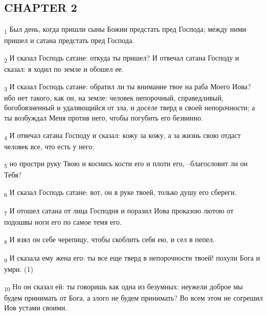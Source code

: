 \subsection{CHAPTER 2}
\begin{tcolorbox}
\textsubscript{1} Был день, когда пришли сыны Божии предстать пред Господа; между ними пришел и сатана предстать пред Господа.
\end{tcolorbox}
\begin{tcolorbox}
\textsubscript{2} И сказал Господь сатане: откуда ты пришел? И отвечал сатана Господу и сказал: я ходил по земле и обошел ее.
\end{tcolorbox}
\begin{tcolorbox}
\textsubscript{3} И сказал Господь сатане: обратил ли ты внимание твое на раба Моего Иова? ибо нет такого, как он, на земле: человек непорочный, справедливый, богобоязненный и удаляющийся от зла, и доселе тверд в своей непорочности; а ты возбуждал Меня против него, чтобы погубить его безвинно.
\end{tcolorbox}
\begin{tcolorbox}
\textsubscript{4} И отвечал сатана Господу и сказал: кожу за кожу, а за жизнь свою отдаст человек все, что есть у него;
\end{tcolorbox}
\begin{tcolorbox}
\textsubscript{5} но простри руку Твою и коснись кости его и плоти его, --благословит ли он Тебя?
\end{tcolorbox}
\begin{tcolorbox}
\textsubscript{6} И сказал Господь сатане: вот, он в руке твоей, только душу его сбереги.
\end{tcolorbox}
\begin{tcolorbox}
\textsubscript{7} И отошел сатана от лица Господня и поразил Иова проказою лютою от подошвы ноги его по самое темя его.
\end{tcolorbox}
\begin{tcolorbox}
\textsubscript{8} И взял он себе черепицу, чтобы скоблить себя ею, и сел в пепел.
\end{tcolorbox}
\begin{tcolorbox}
\textsubscript{9} И сказала ему жена его: ты все еще тверд в непорочности твоей! похули Бога и умри. (1)
\end{tcolorbox}
\begin{tcolorbox}
\textsubscript{10} Но он сказал ей: ты говоришь как одна из безумных: неужели доброе мы будем принимать от Бога, а злого не будем принимать? Во всем этом не согрешил Иов устами своими.
\end{tcolorbox}

